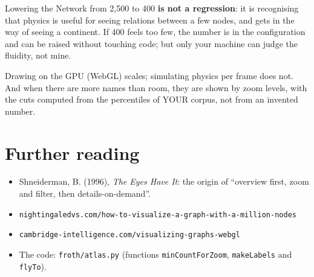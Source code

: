 \documentclass[11pt,a4paper]{article}
\begin{document}
Lowering the Network from 2,500 to 400 \textbf{is not a regression}: it is recognising that
physics is useful for seeing relations between a few nodes, and gets in the way of seeing a
continent. If 400 feels too few, the number is in the configuration and can be raised without
touching code; but only your machine can judge the fluidity, not mine.

\begin{resumen}
Drawing on the GPU (WebGL) scales; simulating physics per frame does not. And when there are
more names than room, they are shown by zoom levels, with the cuts computed from the percentiles
of YOUR corpus, not from an invented number.
\end{resumen}

\section{Further reading}

\begin{itemize}
  \item Shneiderman, B. (1996), \emph{The Eyes Have It}: the origin of ``overview first, zoom
        and filter, then details-on-demand''.
  \item \texttt{nightingaledvs.com/how-to-visualize-a-graph-with-a-million-nodes}
  \item \texttt{cambridge-intelligence.com/visualizing-graphs-webgl}
  \item The code: \texttt{froth/atlas.py} (functions \texttt{minCountForZoom},
        \texttt{makeLabels} and \texttt{flyTo}).
\end{itemize}
\end{document}
